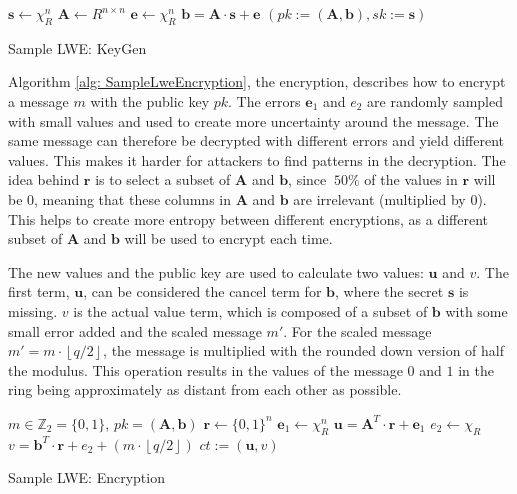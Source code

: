 \begin{algorithm}[htb]
  \begin{algorithmic}[1]
    \STATE $\textbf{s} \leftarrow \chi_R^n$
    \STATE $\textbf{A} \leftarrow R^{n \times n}$
    \STATE $\textbf{e} \leftarrow \chi_R^n$
    \STATE $\textbf{b} = \textbf{A}\cdot \textbf{s}+\textbf{e}$
    \RETURN $(pk:=(\textbf{A}, \textbf{b}), sk:=\textbf{s} )$
  \end{algorithmic}
  \caption{Sample LWE: KeyGen}
  \label{alg: SampleLweKeyGen}
\end{algorithm}

Algorithm \ref{alg: SampleLweEncryption}, the encryption, describes how to encrypt a message $m$ with the public key $pk$. The errors $\textbf{e}_1$ and $e_2$ are randomly sampled with small values and used to create more uncertainty around the message. The same message can therefore be decrypted with different errors and yield different values. This makes it harder for attackers to find patterns in the decryption. The idea behind $\textbf{r}$ is to select a subset of $\textbf{A}$ and $\textbf{b}$, since $~50\%$ of the values in $\textbf{r}$ will be $0$, meaning that these columns in $\textbf{A}$ and $\textbf{b}$ are irrelevant (multiplied by $0$). This helps to create more entropy between different encryptions, as a different subset of $\textbf{A}$ and $\textbf{b}$ will be used to encrypt each time.

The new values and the public key are used to calculate two values: $\textbf{u}$ and $v$. The first term, $\textbf{u}$, can be considered the cancel term for $\textbf{b}$, where the secret $\textbf{s}$ is missing. $v$ is the actual value term, which is composed of a subset of $\textbf{b}$ with some small error added and the scaled message $m'$. For the scaled message $m' = m\cdot \left\lfloor q/2\right\rfloor$, the message is multiplied with the rounded down version of half the modulus. This operation results in the values of the message $0$ and $1$ in the ring being approximately as distant from each other as possible.

\begin{algorithm}[htb]
  \begin{algorithmic}[1]
    \REQUIRE $m \in \mathbb{Z}_2 = \{0, 1\}$, $pk = (\textbf{A}, \textbf{b})$
    \STATE $\textbf{r} \leftarrow \{0, 1\}^n$
    \STATE $\textbf{e}_1 \leftarrow \chi_R^n$
    \STATE $\textbf{u} = \textbf{A}^T \cdot \textbf{r} + \textbf{e}_1$
    \STATE $e_2 \leftarrow \chi_R$
    \STATE $v = \textbf{b}^T \cdot \textbf{r} + e_2 + (m\cdot \left\lfloor q/2\right\rfloor)$
    \RETURN $ct := (\textbf{u}, v)$
  \end{algorithmic}
  \caption{Sample LWE: Encryption}
  \label{alg: SampleLweEncryption}
\end{algorithm}

